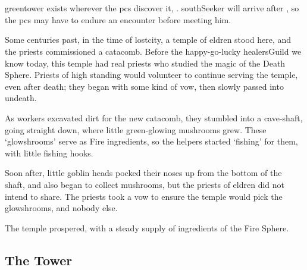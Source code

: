 \section{}
\label{green_tower}

\begin{multicols}{2}

\Gls{greentower} exists wherever the \glspl{pc} discover it, .
\Gls{southSeeker} will arrive after , so the \glspl{pc} may have to endure an encounter before meeting him.



\begin{exampletext}
  Some centuries past, in the time of \gls{lostcity}, a temple of \gls{eldren} stood here, and the priests commissioned a catacomb.
  Before the happy-go-lucky \gls{healersGuild} we know today, this temple had real priests who studied the magic of the Death Sphere.
  Priests of high standing would volunteer to continue serving the temple, even after death; they began with some kind of vow, then slowly passed into undeath.

  As workers excavated dirt for the new catacomb, they stumbled into a cave-shaft, going straight down, where little green-glowing mushrooms grew.%
  These `glowshrooms' serve as Fire \glspl{ingredient}, so the \glspl{helper} started `fishing' for them, with little fishing hooks.

  Soon after, little goblin heads pocked their noses up from the bottom of the shaft, and also began to collect mushrooms, but the priests of \gls{eldren} did not intend to share.
  The priests took a vow to ensure the temple would pick the glowshrooms, and nobody else.

  The temple prospered, with a steady supply of \glspl{ingredient} of the Fire Sphere.
\end{exampletext}

\subsection{The Tower}


\end{multicols}
